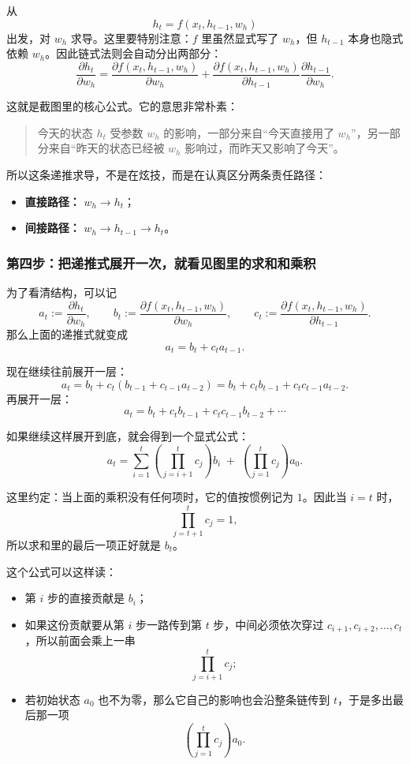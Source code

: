 \documentclass[12pt,a4paper]{ctexart}
\begin{document}
从
\[
h_t = f(x_t, h_{t-1}, w_h)
\]
出发，对 \(w_h\) 求导。这里要特别注意：\(f\) 里虽然显式写了 \(w_h\)，但 \(h_{t-1}\) 本身也隐式依赖 \(w_h\)。因此链式法则会自动分出两部分：
\[
\frac{\partial h_t}{\partial w_h}
=
\frac{\partial f(x_t, h_{t-1}, w_h)}{\partial w_h}
+
\frac{\partial f(x_t, h_{t-1}, w_h)}{\partial h_{t-1}}
\frac{\partial h_{t-1}}{\partial w_h}.
\]

这就是截图里的核心公式。它的意思非常朴素：
\begin{quote}
今天的状态 \(h_t\) 受参数 \(w_h\) 的影响，一部分来自“今天直接用了 \(w_h\)”，另一部分来自“昨天的状态已经被 \(w_h\) 影响过，而昨天又影响了今天”。
\end{quote}

所以这条递推求导，不是在炫技，而是在认真区分两条责任路径：
\begin{itemize}
  \item \textbf{直接路径：} \(w_h \rightarrow h_t\)；
  \item \textbf{间接路径：} \(w_h \rightarrow h_{t-1} \rightarrow h_t\)。
\end{itemize}

\subsubsection*{第四步：把递推式展开一次，就看见图里的求和和乘积}

为了看清结构，可以记
\[
a_t := \frac{\partial h_t}{\partial w_h}, \qquad
b_t := \frac{\partial f(x_t, h_{t-1}, w_h)}{\partial w_h}, \qquad
c_t := \frac{\partial f(x_t, h_{t-1}, w_h)}{\partial h_{t-1}}.
\]
那么上面的递推式就变成
\[
a_t = b_t + c_t a_{t-1}.
\]

现在继续往前展开一层：
\[
a_t = b_t + c_t(b_{t-1} + c_{t-1}a_{t-2})
= b_t + c_t b_{t-1} + c_t c_{t-1} a_{t-2}.
\]
再展开一层：
\[
a_t
=
b_t + c_t b_{t-1} + c_t c_{t-1} b_{t-2} + \cdots
\]

如果继续这样展开到底，就会得到一个显式公式：
\[
a_t
=
\sum_{i=1}^{t}
\left(
\prod_{j=i+1}^{t} c_j
\right)b_i
\;+\;
\left(
\prod_{j=1}^{t} c_j
\right)a_0.
\]

这里约定：当上面的乘积没有任何项时，它的值按惯例记为 \(1\)。因此当 \(i=t\) 时，
\[
\prod_{j=t+1}^{t} c_j = 1,
\]
所以求和里的最后一项正好就是 \(b_t\)。

这个公式可以这样读：
\begin{itemize}
  \item 第 \(i\) 步的直接贡献是 \(b_i\)；
  \item 如果这份贡献要从第 \(i\) 步一路传到第 \(t\) 步，中间必须依次穿过 \(c_{i+1}, c_{i+2}, \ldots, c_t\)，所以前面会乘上一串
  \[
  \prod_{j=i+1}^{t} c_j;
  \]
  \item 若初始状态 \(a_0\) 也不为零，那么它自己的影响也会沿整条链传到 \(t\)，于是多出最后那一项
  \[
  \left(\prod_{j=1}^{t} c_j\right)a_0.
  \]
\end{itemize}
\end{document}
